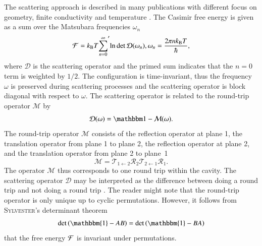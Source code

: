 The scattering approach is described in many publications with different
focus on geometry, finite conductivity and temperature \cite{Durand, PhysRevLett.102.230404, ThermalCasimirEffect, ScatteringApproach,
CasimirWithinScatteringTheory, Lambrecht:CasimirScatteringApproach,
ScatterinTheoryApproach, Reynaud:ScatteringApproach}.
The Casimir free energy is given as a sum over the Matsubara frequencies
$\omega_n$
\begin{equation}
\mathcal{F} = k_\text{B} T {\sum_{n=0}^\infty}^\prime \text{ln}\det \mathcal{D}(\omega_n), \\ \omega_n = \frac{2\pi n k_\text{B} T}{\hbar},
\end{equation}
where $\mathcal{D}$ is the scattering operator and the primed sum indicates
that the $n=0$ term is weighted by $1/2$.
The configuration is time-invariant, thus
the frequency $\omega$ is preserved during scattering processes and the
scattering operator is block diagonal with respect to $\omega$.
The scattering operator is related to the round-trip operator $\mathcal{M}$ by
\begin{equation}
\mathcal{D}(\omega) = \Id-\mathcal{M}(\omega).
\end{equation}
The round-trip operator $\mathcal{M}$ consists of the reflection operator at
plane 1, the translation operator from plane 1 to plane 2, the reflection operator
at plane 2, and the translation operator from plane 2 to plane~1
\begin{equation}
\mathcal{M} = \mathcal{T}_{1\leftarrow 2} \mathcal{R}_2 \mathcal{T}_{2\leftarrow 1} \mathcal{R}_1.
\end{equation}
The operator $\mathcal{M}$ thus corresponds to one round trip within the
cavity. The scattering operator $\mathcal{D}$ may be interpreted as the
difference between doing a round trip and not doing a round trip \cite{Durand}.
The reader might note that the round-trip operator is only unique up to cyclic
permutations. However, it follows from \textsc{Sylvester}'s determinant theorem 
\begin{equation}
\det\left(\mathbbm{1} - AB\right) = \det\left(\mathbbm{1} - BA\right)
\end{equation}
that the free energy $\mathcal{F}$ is invariant under permutations.

